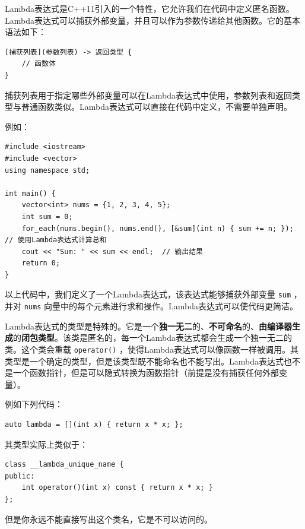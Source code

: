 Lambda表达式是C++11引入的一个特性，它允许我们在代码中定义匿名函数。Lambda表达式可以捕获外部变量，并且可以作为参数传递给其他函数。它的基本语法如下：
\begin{verbatim}
[捕获列表](参数列表) -> 返回类型 {
    // 函数体
}
\end{verbatim}
捕获列表用于指定哪些外部变量可以在Lambda表达式中使用，参数列表和返回类型与普通函数类似。Lambda表达式可以直接在代码中定义，不需要单独声明。

例如：
\begin{verbatim}
#include <iostream>
#include <vector>
using namespace std;

int main() {
    vector<int> nums = {1, 2, 3, 4, 5};
    int sum = 0;
    for_each(nums.begin(), nums.end(), [&sum](int n) { sum += n; });  // 使用Lambda表达式计算总和
    cout << "Sum: " << sum << endl;  // 输出结果
    return 0;
}
\end{verbatim}
以上代码中，我们定义了一个Lambda表达式，该表达式能够捕获外部变量 \texttt{sum} ，并对 \texttt{nums} 向量中的每个元素进行求和操作。Lambda表达式可以使代码更简洁。

Lambda表达式的类型是特殊的。它是一个\textbf{独一无二}的、\textbf{不可命名}的、\textbf{由编译器生成}的\textbf{闭包类型}。该类是匿名的，每一个Lambda表达式都会生成一个独一无二的类。这个类会重载 \texttt{operator()} ，使得Lambda表达式可以像函数一样被调用。其类型是一个确定的类型，但是该类型既不能命名也不能写出。Lambda表达式也不是一个函数指针，但是可以隐式转换为函数指针（前提是没有捕获任何外部变量）。

例如下列代码：
\begin{verbatim}
auto lambda = [](int x) { return x * x; };
\end{verbatim}
其类型实际上类似于：
\begin{verbatim}
class __lambda_unique_name {
public:
    int operator()(int x) const { return x * x; }
};
\end{verbatim}
但是你永远不能直接写出这个类名，它是不可以访问的。

